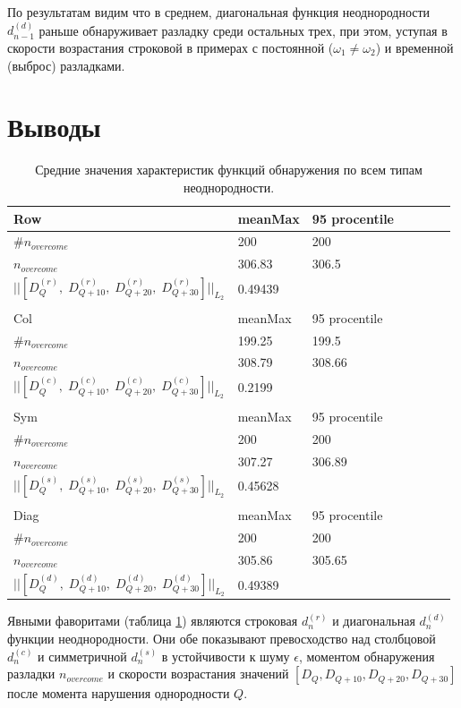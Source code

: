 \documentclass[specialist, substylefile = spbu.rtx,
			   subf, href, 12pt]{disser}
\begin{document}
По результатам видим что в среднем, диагональная функция неоднородности $d_{n-1}^{(d)}$ раньше обнаруживает разладку среди остальных трех, при этом, уступая в скорости возрастания строковой в примерах с постоянной ($\omega_1 \neq \omega_2$) и временной (выброс) разладками. 

\newpage
\section{Выводы}

\begin{table}[!hhh]
	\center
	\caption{Средние значения характеристик функций обнаружения по всем типам неоднородности.}
	\begin{tabular}{l|llllll}
		Row & meanMax & 95 procentile \\
		\hline
		$\#n_{overcome}$ & 200 & 200 \\
		$n_{overcome}$ & 306.83 & 306.5 \\
		$||[D_Q^{(r)},\; D_{Q+10}^{(r)},\; D_{Q+20}^{(r)},\; D_{Q+30}^{(r)}]||_{L_2}$ & 0.49439 &  \\
		&  &  \\
		Col & meanMax & 95 procentile \\
		\hline
		$\#n_{overcome}$ & 199.25 & 199.5 \\
		$n_{overcome}$ & 308.79 & 308.66 \\
		$||[D_Q^{(c)},\; D_{Q+10}^{(c)},\; D_{Q+20}^{(c)},\; D_{Q+30}^{(c)}]||_{L_2}$ & 0.2199 & \\
		&  &  \\
		Sym & meanMax & 95 procentile \\
		\hline
		$\#n_{overcome}$ & 200 & 200 \\
		$n_{overcome}$ & 307.27 & 306.89 \\
		$||[D_Q^{(s)},\; D_{Q+10}^{(s)},\; D_{Q+20}^{(s)},\; D_{Q+30}^{(s)}]||_{L_2}$ & 0.45628 & \\
		&  &  \\
		Diag & meanMax & 95 procentile \\
		\hline
		$\#n_{overcome}$ & 200 & 200 \\
		$n_{overcome}$ & 305.86 & 305.65 \\
		$||[D_Q^{(d)},\; D_{Q+10}^{(d)},\; D_{Q+20}^{(d)},\; D_{Q+30}^{(d)}]||_{L_2}$ & 0.49389 & 
	\end{tabular}
	\label{tab:AvgResultsNoise}
\end{table}

Явными фаворитами (таблица \ref{tab:AvgResultsNoise}) являются строковая $d_{n}^{(r)}$ и диагональная $d_{n}^{(d)}$ функции неоднородности. Они обе показывают превосходство над столбцовой $d_{n}^{(c)}$ и симметричной $d_{n}^{(s)}$ в устойчивости к шуму $\epsilon$, моментом обнаружения разладки $n_{overcome}$ и скорости возрастания значений $[D_Q, D_{Q+10}, D_{Q+20}, D_{Q+30}]$ после момента нарушения однородности $Q$.
\end{document}
